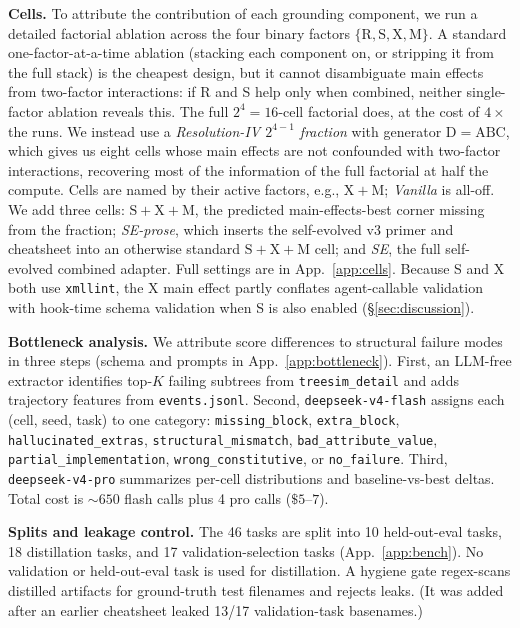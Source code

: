 \documentclass{article}
\begin{document}
\textbf{Cells.} To attribute the contribution of each grounding component, we run a detailed factorial ablation across the four binary factors $\{\mathrm{R, S, X, M}\}$. A standard one-factor-at-a-time ablation (stacking each component on, or stripping it from the full stack) is the cheapest design, but it cannot disambiguate main effects from two-factor interactions: if R and S help only when combined, neither single-factor ablation reveals this. The full $2^4 = 16$-cell factorial does, at the cost of $4{\times}$ the runs. We instead use a \emph{Resolution-IV $2^{4-1}$ fraction} with generator $\mathrm{D}{=}\mathrm{ABC}$, which gives us eight cells whose main effects are not confounded with two-factor interactions, recovering most of the information of the full factorial at half the compute. Cells are named by their active factors, e.g., $\mathrm{X+M}$; \emph{Vanilla} is all-off. We add three cells: $\mathrm{S+X+M}$, the predicted main-effects-best corner missing from the fraction; \emph{SE-prose}, which inserts the self-evolved v3 primer and cheatsheet into an otherwise standard $\mathrm{S+X+M}$ cell; and \emph{SE}, the full self-evolved combined adapter. Full settings are in App.~\ref{app:cells}. Because S and X both use \texttt{xmllint}, the X main effect partly conflates agent-callable validation with hook-time schema validation when S is also enabled (\S\ref{sec:discussion}).

\textbf{Bottleneck analysis.} We attribute score differences to structural failure modes in three steps (schema and prompts in App.~\ref{app:bottleneck}). First, an LLM-free extractor identifies top-$K$ failing subtrees from \texttt{treesim\_detail} and adds trajectory features from \texttt{events.jsonl}. Second, \texttt{deepseek-v4-flash} assigns each (cell, seed, task) to one category: \texttt{missing\_block}, \texttt{extra\_block}, \texttt{hallucinated\_extras}, \texttt{structural\_mismatch}, \texttt{bad\_attribute\_value}, \texttt{partial\_implementation}, \texttt{wrong\_constitutive}, or \texttt{no\_failure}. Third, \texttt{deepseek-v4-pro} summarizes per-cell distributions and baseline-vs-best deltas. Total cost is ${\sim}650$ flash calls plus 4 pro calls ($\$5\text{--}7$).

\textbf{Splits and leakage control.} The 46 tasks are split into 10 held-out-eval tasks, 18 distillation tasks, and 17 validation-selection tasks (App.~\ref{app:bench}). No validation or held-out-eval task is used for distillation. A hygiene gate regex-scans distilled artifacts for ground-truth test filenames and rejects leaks. (It was added after an earlier cheatsheet leaked 13/17 validation-task basenames.)
\end{document}
